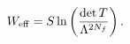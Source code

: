 \begin{equation}\label{Eq:Weff_1}
W_{\rm eff}=S 
\ln\left(
\frac{
	\det T
}
{
	\Lambda^{2N_f}
}
\right).
\end{equation}

